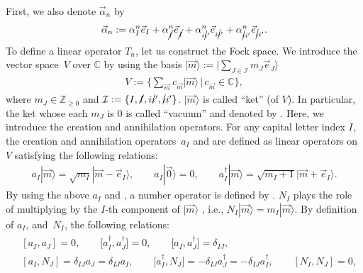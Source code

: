\documentclass[10pt,a4paper]{amsart}
\numberwithin{equation}{section}
\begin{document}
First, we also denote $\vec{\alpha}_{n}$ by
\begin{align*}
\vec{\alpha}_{n}
:=
\alpha_{I}^{n}
\vec{e}_{I}
+
\alpha_{\cancel{I}}^{n}
\vec{e}_{\cancel{I}}
+
\alpha_{i\cancel{i}'}^{n}
\vec{e}_{i\cancel{i}'}
+
\alpha_{\cancel{i}i'}^{n}
\vec{e}_{\cancel{i}i'}
.
\end{align*}
To define a linear operator $T_{n}$, let us construct the Fock space. We introduce the vector space~$V$ over $\mathbb{C}$ by using the basis
$
\big|
\vec{m}
\big\rangle
:=
\bigl|
\sum_{
J
\in
\mathcal{I}
}
m_{J}
\vec{e}_{J}
\big\rangle
$
\begin{align*}
V
:=
\bigg\{
\sum_{
\vec{m}
}
c_{
\vec{m}
}
|
\vec{m}
\rangle
\,\bigg|\,
c_{
\vec{m}
}
\in
\mathbb{C}
\bigg\},
\end{align*}
where
$
m_{J}
\in
\mathbb{Z}_{\geq0}
$
and
$
\mathcal{I}
:=
\{
I,
\cancel{I},
i\cancel{i}',
\cancel{i}i'
\}
$.
$
|
\vec{m}
\rangle
$
is called ``ket'' (of $V$). In particular, the ket whose each $m_{J}$ is 0 is called ``vacuum'' and denoted by
.
Here, we introduce the creation and annihilation operators. For any capital letter index $I$, the creation and annihilation operators~$a_{I}$ and  are defined as
linear operators on $V$ satisfying the following relations:
\begin{align*}
 a_{I}
 |
 \vec{m}
 \rangle
 =
 \sqrt{m_{I}}
|
 \vec{m}
 -
 \vec{e}_{I}
\rangle,
 \qquad
 a_{I}
 |\vec{0}\rangle
 =
 0,
 \qquad
 a_{I}^{\dagger}
|
 \vec{m}
\rangle
 =
 \sqrt{m_{I}+1}
|
 \vec{m}
 +
 \vec{e}_{I}
\rangle
 .
\end{align*}
By using the above $a_{I}$ and , a number operator is defined by
.
$N_{I}$ plays the role of multiplying
by the $I$-th component
of
$
|
 \vec{m}
\rangle
$
,
i.e.,
$
 N_{I}
|
 \vec{m}
\rangle
 =
 m_{I}
|
 \vec{m}
\rangle$.
By definition of $a_{I}$,  and~$N_{I}$, the following relations:
\begin{gather*}
\begin{split}
& [
 a_{I},
 a_{J}
 ]
 =
 0,
\qquad
 \big[
 a_{I}^{\dagger},
 a_{J}^{\dagger}
 \big]
 =
 0,
\qquad
 \big[
 a_{I},
 a_{J}^{\dagger}
 \big]
 =
 \delta_{IJ},
 \\
& [
 a_{I},
 N_{J}
 ]
 =
 \delta_{IJ}a_{J}
 =
 \delta_{IJ}a_{I}
 ,
\qquad
 \big[
 a_{I}^{\dagger},
 N_{J}
 \big]
 =
 -\delta_{IJ}a_{J}^{\dagger}
 =
 -\delta_{IJ}a_{I}^{\dagger}
 ,
\qquad
 [
 N_{I},
 N_{J}
 ]
 =
 0,
\end{split}
\end{gather*}
\end{document}
